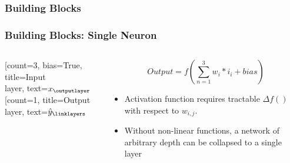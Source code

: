 \documentclass{beamer}
\begin{document}
\subsubsection{Building Blocks}
\begin{frame}[fragile]
\frametitle{Building Blocks: Single Neuron}
\begin{columns}
	\begin{column}{0.4\textwidth}
	    \begin{neuralnetwork}[height=4]
		\newcommand{\x}[2]{$x_#2$}
		\newcommand{\y}[2]{$\hat{y}_#2$}
		[count=3, bias=True, title=Input\\layer, text=\x]
		\outputlayer[count=1, title=Output\\layer, text=\y] \linklayers
	    \end{neuralnetwork}
	\end{column}

	\begin{column}{0.5\textwidth}
		\begin{figure}
			\begin{equation*}
				Output = f(\sum_{n=1}^{3} w_i*i_i+ bias)
			\end{equation*}
		\end{figure}

		\begin{small}
		\begin{itemize}
			\item Activation function requires tractable $\Delta f()$ with respect to $w_{i,j}$. 
			\item Without non-linear functions, a network of arbitrary depth can be collapsed to a single layer\cite{baldi1989neural}
		\end{itemize}
		\end{small}
	\end{column}
\end{columns}
\end{frame}
\end{document}
